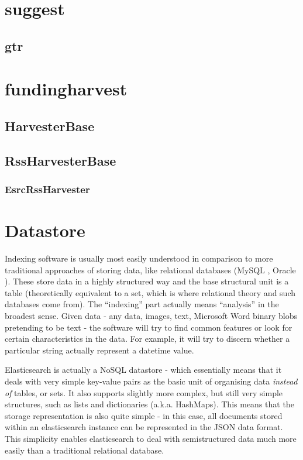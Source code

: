\section{suggest}

\subsection{gtr}

\section{fundingharvest}
\label{design-main-last}

\subsection{HarvesterBase}


\subsection{RssHarvesterBase}

\subsubsection{EsrcRssHarvester}

\section{Datastore}
\label{design-datastore}
 Indexing software is usually most easily understood in comparison to more traditional approaches of storing data, like relational databases (MySQL \cite{mysql}, Oracle \cite{oracle}). These store data in a highly structured way and the base structural unit is a table (theoretically equivalent to a set, which is where relational theory and such databases come from). The ``indexing'' part actually means ``analysis'' in the broadest sense. Given data - any data, images, text, Microsoft Word binary blobs pretending to be text - the software will try to find common features or look for certain characteristics in the data. For example, it will try to discern whether a particular string actually represent a datetime value.
 
 Elasticsearch is actually a NoSQL datastore - which essentially means that it deals with very simple key-value pairs as the basic unit of organising data \emph{instead of} tables, or sets. It also supports slightly more complex, but still very simple structures, such as lists and dictionaries (a.k.a. HashMaps). This means that the storage representation is also quite simple - in this case, all documents stored within an elasticsearch instance can be represented in the JSON data format. This simplicity enables elasticsearch to deal with semistructured data much more easily than a traditional relational database.
 
